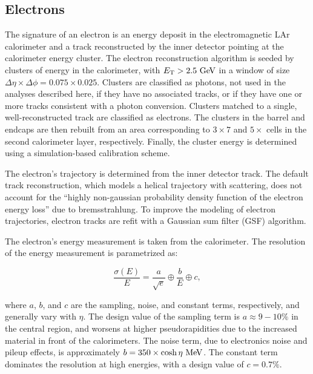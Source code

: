 \subsection{Electrons}\label{sec:event-reconstruction-electrons}
The signature of an electron is an energy deposit in the electromagnetic LAr calorimeter and a track reconstructed by the inner detector pointing at the calorimeter energy cluster.  The electron reconstruction algorithm is seeded by clusters of energy in the calorimeter, with $\Et>2.5 \GeV$ in a window of size $\Delta\eta\times\Delta\phi=0.075\times0.025$. Clusters are classified as photons, not used in the analyses described here, if they have no associated tracks, or if they have one or more tracks consistent with a photon conversion. Clusters matched to a single, well-reconstructed track are classified as electrons. The clusters in the barrel and endcaps are then rebuilt from an area corresponding to $3\times7$ and $5\times$ cells in the second calorimeter layer, respectively. Finally, the cluster energy is determined using a simulation-based calibration scheme. 

The electron's trajectory is determined from the inner detector track. The default track reconstruction, which models a helical trajectory with scattering, does not account for the ``highly non-gaussian probability density function of the electron energy loss'' due to bremsstrahlung\cite{Cornelissen:2007vba,TheATLASCollaboration:2012vr}. To improve the modeling of electron trajectories, electron tracks are refit with a Gaussian sum filter (GSF) algorithm. 

The electron's energy measurement is taken from the calorimeter. The resolution of the energy measurement is parametrized as:

\begin{equation}
	\frac{\sigma(E)}{E} = \frac{a}{\sqrt{e}} \oplus \frac{b}{E} \oplus c,
\end{equation}

where $a$, $b$, and $c$ are the sampling, noise, and constant terms, respectively, and generally vary with $\eta$. The design value of the sampling term is $a\approx 9-10\%$ in the central region, and worsens at higher pseudorapidities due to the increased material in front of the calorimeters. The noise term, due to electronics noise and pileup effects, is approximately $b = 350 \times \cosh\eta \MeV$. The constant term dominates the resolution at high energies, with a design value of $c=0.7\%$. 

